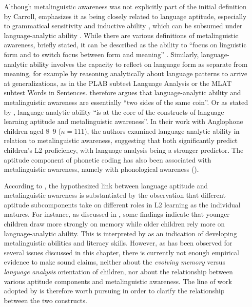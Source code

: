 \documentclass[output=paper]{langscibook}
\begin{document}
Although metalinguistic awareness was not explicitly part of the initial definition by Carroll, \citet{Singleton2014} emphasizes it as being closely related to language aptitude, especially to grammatical sensitivity and inductive ability \citep{AldersonEtAl1997}, which can be subsumed under language-ana\-ly\-tic ability \citep{Skehan1998}. While there are various definitions of metalinguistic awareness, briefly stated, it can be described as the ability to “focus on linguistic form and to switch focus between form and meaning” \citep[277]{Jessner2008}. Similarly, language-ana\-ly\-tic ability involves the capacity to reflect on language form as separate from meaning, for example by reasoning analytically about language patterns to arrive at generalizations, as in the PLAB subtest Language Analysis or the MLAT subtest Words in Sentences. \citet[163]{Ranta2002} therefore argues that language-analytic ability and metalinguistic awareness are essentially “two sides of the same coin”. Or as stated by \citet[1111]{RoehrBrackinTellier2019}, language-analytic ability “is at the core of the constructs of language learning aptitude and metalinguistic awareness”. In their work with Anglophone children aged 8--9 ($n=111$), the authors examined language-analytic ability in relation to metalinguistic awareness, suggesting that both significantly predict children’s L2 proficiency, with language analysis being a stronger predictor. The aptitude component of phonetic coding has also been associated with metalinguistic awareness, namely with phonological awareness (\citealt{RoehrBrackinTellier2019}).

According to \citet{RoehrBrackinTellier2019}, the hypothesized link between language aptitude and metalinguistic awareness is substantiated by the observation that different aptitude subcomponents take on different roles in L2 learning as the individual matures. For instance, as discussed in , some findings indicate that younger children draw more strongly on memory while older children rely more on language-analytic ability. This is interpreted by \citet{RoehrBrackinTellier2019} as an indication of developing metalinguistic abilities and literacy skills. However, as has been observed for several issues discussed in this chapter, there is currently not enough empirical evidence to make sound claims, neither about the \textit{evolving memory} versus \textit{language analysis} orientation of children, nor about the relationship between various aptitude components and metalinguistic awareness. The line of work adopted by \citet{RoehrBrackinTellier2019} is therefore worth pursuing in order to clarify the relationship between the two constructs.
\end{document}
